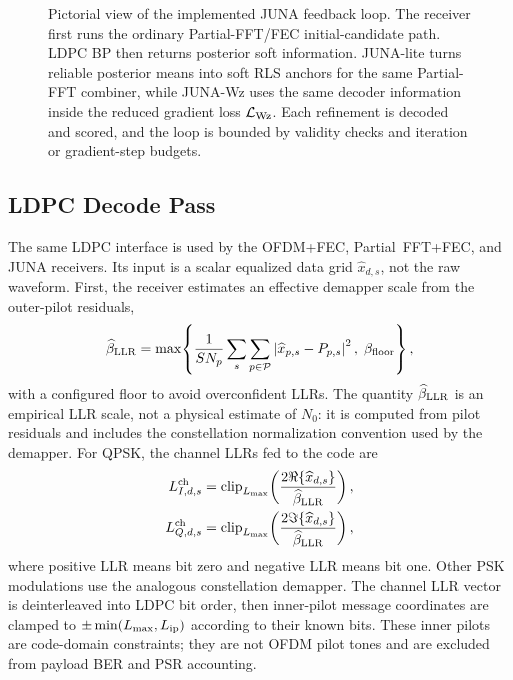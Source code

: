 \documentclass[journal]{IEEEtran}
\newcommand{\abs}[1]{\left\lvert #1 \right\rvert}
\newcommand{\juna}{JUNA}
\newcommand{\junalite}{JUNA-lite}
\newcommand{\junawz}{JUNA-Wz}
\begin{document}
\begin{figure}[t]
{%
}
\caption{Pictorial view of the implemented \juna{} feedback loop. The receiver
first runs the ordinary Partial-FFT/FEC initial-candidate path. LDPC BP then returns
posterior soft information. \junalite{} turns reliable posterior means into
soft RLS anchors for the same Partial-FFT combiner, while \junawz{} uses the
same decoder information inside the reduced gradient loss
\(\mathcal L_{\rm Wz}\). Each refinement is decoded and scored, and the loop is
bounded by validity checks and iteration or gradient-step budgets.}
\label{fig:juna-iterative-loop}
\end{figure}

\subsection{LDPC Decode Pass}
The same LDPC interface is used by the OFDM+FEC, Partial~FFT+FEC, and \juna{}
receivers. Its input is a scalar equalized data grid
$\widehat x_{d,s}$, not the raw waveform. First, the receiver estimates an
effective demapper scale from the outer-pilot residuals,
\begin{equation}
  \widehat\beta_{\rm LLR}
  =\max\!\left\{
    \frac{1}{SN_p}\sum_{s}\sum_{p\in\mathcal P}
      \abs{\widehat x_{p,s}-P_{p,s}}^2,\;
    \beta_{\rm floor}
  \right\},
  \label{eq:fec-sigma}
\end{equation}
with a configured floor to avoid overconfident LLRs. The quantity
$\widehat\beta_{\rm LLR}$ is an empirical LLR scale, not a physical estimate of
$N_0$: it is computed from pilot residuals and includes the constellation
normalization convention used by the demapper. For QPSK, the channel LLRs fed to
the code are
\begin{equation}
  \begin{aligned}
  L^{\rm ch}_{I,d,s}
    &=\mathrm{clip}_{L_{\max}}\!\left(
      \frac{2\Re\{\widehat x_{d,s}\}}
      {\widehat\beta_{\rm LLR}}\right),\\
  L^{\rm ch}_{Q,d,s}
    &=\mathrm{clip}_{L_{\max}}\!\left(
      \frac{2\Im\{\widehat x_{d,s}\}}
      {\widehat\beta_{\rm LLR}}\right),
  \end{aligned}
  \label{eq:qpsk-channel-llr}
\end{equation}
where positive LLR means bit zero and negative LLR means bit one. Other PSK
modulations use the analogous constellation demapper. The channel LLR vector is
deinterleaved into LDPC bit order, then inner-pilot message coordinates are
clamped to $\pm\min(L_{\max},L_{\rm ip})$ according to their known bits. These
inner pilots are code-domain constraints; they are not OFDM pilot tones and are
excluded from payload BER and PSR accounting.
\end{document}
